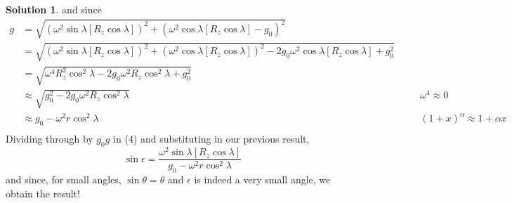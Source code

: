 \documentclass[10pt]{article}
\theoremstyle{definition}
\newtheorem{soln}{Solution}
\newcommand{\justif}[2]{&{#1}&\text{#2}}
\begin{document}
\begin{soln}
  and since
  \begin{align*}
    g & =\sqrt{\left(\omega^2\sin\lambda\left[ R_z\cos\lambda\right]\right)^2
    +\left(\omega^2\cos\lambda\left[ R_z\cos\lambda\right]-g_0\right)^2}                    \\
      & =\sqrt{\left(\omega^2\sin\lambda\left[ R_z\cos\lambda\right]\right)^2
      +(\omega^2\cos\lambda\left[ R_z\cos\lambda\right])^2-2g_0\omega^2\cos\lambda\left[ R_z\cos\lambda\right]
    +g_0^2}                                                                                 \\
      & =\sqrt{\omega^4R_z^2\cos^2\lambda-2g_0\omega^2R_z\cos^2\lambda
    +g_0^2}                                                                                 \\
      & \approx\sqrt{g_0^2-2g_0\omega^2R_z\cos^2\lambda}\justif{\quad}{$\omega^4\approx 0$} \\
      & \approx g_0-\omega^2r\cos^2\lambda\justif{\quad}{$(1+x)^\alpha\approx1+\alpha x$}   \\
  \end{align*}
  Dividing through by $g_0g$ in (4) and substituting in our previous result,
  $$\sin\epsilon=\frac{\omega^2\sin\lambda\left[ R_z\cos\lambda\right]}{g_0-\omega^2r\cos^2\lambda}$$
  and since, for small angles, $\sin\theta=\theta$ and $\epsilon$ is indeed a very small angle, we obtain the result!
\end{soln}
\end{document}

